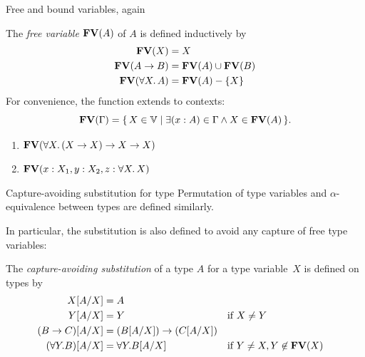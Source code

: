 \begin{frame}{Free and bound variables, again}
\begin{definition}
  The \emph{free variable} $\mathbf{FV}(A)$ of $A$ is defined inductively by
  \begin{align*}
    \mathbf{FV}(X)              & = X \\
    \mathbf{FV}(A \to B)        & = \mathbf{FV}(A) \cup \mathbf{FV}(B) \\
    \mathbf{FV}(\forall X.\, A) & = \mathbf{FV}(A) - \{X\}
  \end{align*}
  For convenience, the function extends to contexts:
  \[
    \mathbf{FV}(\Gamma) = \{\, X \in \mathbb{V}\mid \exists (x : A) \in \Gamma
      \wedge X \in \mathbf{FV}(A) \,\}.
  \]
\end{definition}
\begin{exercise*}

  \begin{enumerate}
    \item $\mathbf{FV}(\forall X.\, (X \to X) \to X \to X)$
    \item $\mathbf{FV}(x : X_1, y : X_2, z : \forall X.\,X)$
  \end{enumerate}
\end{exercise*}
\end{frame}

\begin{frame}{Capture-avoiding substitution for type}
  Permutation of type variables and $\alpha$-equivalence between types are defined similarly. 

  In particular, the substitution is also defined to avoid any capture of free type variables:
  \begin{definition}
  The \emph{capture-avoiding substitution} of a type $A$ for a type variable~$X$ is defined on types by 
  \begin{align*}
    X[{A}/{X}] & = A \\
    Y[{A}/{X}] & = Y && \text{if $X \neq Y$}\\
    (B \to C)[{A}/{X}] & = (B[{A}/{X}]) \to (C[{A}/{X}]) \\
    (\forall Y.B)[{A}/{X}] & = \forall Y. B[{A}/{X}] &&
    \text{if $Y \neq X, Y \not\in \mathbf{FV}(X)$} 
  \end{align*}
  \end{definition}
\end{frame}

